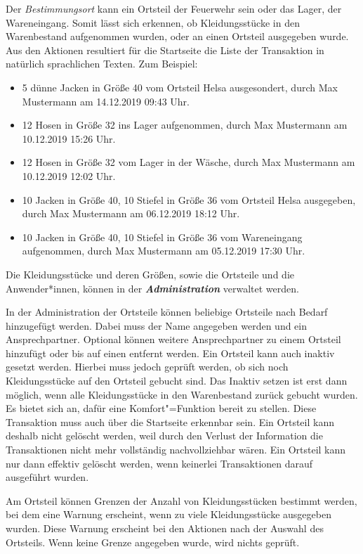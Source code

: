 Der \textit{Bestimmungsort} kann ein Ortsteil der Feuerwehr sein oder das Lager, \bzw der Wareneingang. Somit lässt sich erkennen, ob Kleidungsstücke in den Warenbestand aufgenommen wurden, oder an einen Ortsteil ausgegeben wurde.
Aus den Aktionen resultiert für die Startseite die Liste der Transaktion in natürlich sprachlichen Texten. Zum Beispiel: 
\begin{itemize}
\item 5 dünne Jacken in Größe 40 vom Ortsteil Helsa ausgesondert, durch Max Mustermann am 14.12.2019 09:43 Uhr.
\item 12 Hosen in Größe 32 ins Lager aufgenommen, durch Max Mustermann am 10.12.2019 15:26 Uhr.
\item 12 Hosen in Größe 32 vom Lager in der Wäsche, durch Max Mustermann am 10.12.2019 12:02 Uhr.
\item 10 Jacken in Größe 40, 10 Stiefel in Größe 36 vom Ortsteil Helsa ausgegeben, durch Max Mustermann am 06.12.2019 18:12 Uhr.
\item 10 Jacken in Größe 40, 10 Stiefel in Größe 36 vom Wareneingang aufgenommen, durch Max Mustermann am 05.12.2019 17:30 Uhr.
\end{itemize}

Die Kleidungsstücke und deren Größen, sowie die Ortsteile und die Anwender*innen, können in der \textbf{\textit{Administration}} verwaltet werden.

In der Administration der Ortsteile können beliebige Ortsteile nach Bedarf hinzugefügt werden. Dabei muss der Name angegeben werden und ein Ansprechpartner. Optional können weitere Ansprechpartner zu einem Ortsteil hinzufügt oder bis auf einen entfernt werden. Ein Ortsteil kann auch inaktiv gesetzt werden. Hierbei muss jedoch geprüft werden, ob sich noch Kleidungsstücke auf den Ortsteil gebucht sind. Das Inaktiv setzen ist erst dann möglich, wenn alle Kleidungsstücke in den Warenbestand zurück gebucht wurden. Es bietet sich an, dafür eine Komfort"=Funktion bereit zu stellen. Diese Transaktion muss auch über die Startseite erkennbar sein. Ein Ortsteil kann deshalb nicht gelöscht werden, weil durch den Verlust der Information die Transaktionen nicht mehr vollständig nachvollziehbar wären. Ein Ortsteil kann nur dann effektiv gelöscht werden, wenn keinerlei Transaktionen darauf ausgeführt wurden.

Am Ortsteil können Grenzen der Anzahl von Kleidungsstücken bestimmt werden, bei dem eine Warnung erscheint, wenn zu viele Kleidungsstücke ausgegeben wurden. Diese Warnung erscheint bei den Aktionen nach der Auswahl des Ortsteils. Wenn keine Grenze angegeben wurde, wird nichts geprüft.

